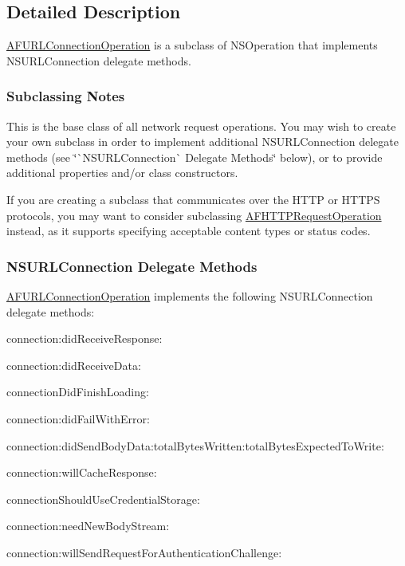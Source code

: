 \subsection{Detailed Description}
{\ttfamily \mbox{\hyperlink{interface_a_f_u_r_l_connection_operation}{A\+F\+U\+R\+L\+Connection\+Operation}}} is a subclass of {\ttfamily N\+S\+Operation} that implements {\ttfamily N\+S\+U\+R\+L\+Connection} delegate methods.

\subsubsection*{Subclassing Notes}

This is the base class of all network request operations. You may wish to create your own subclass in order to implement additional {\ttfamily N\+S\+U\+R\+L\+Connection} delegate methods (see \char`\"{}\`{}\+N\+S\+U\+R\+L\+Connection\`{} Delegate Methods\char`\"{} below), or to provide additional properties and/or class constructors.

If you are creating a subclass that communicates over the H\+T\+TP or H\+T\+T\+PS protocols, you may want to consider subclassing {\ttfamily \mbox{\hyperlink{interface_a_f_h_t_t_p_request_operation}{A\+F\+H\+T\+T\+P\+Request\+Operation}}} instead, as it supports specifying acceptable content types or status codes.

\subsubsection*{N\+S\+U\+R\+L\+Connection Delegate Methods}

{\ttfamily \mbox{\hyperlink{interface_a_f_u_r_l_connection_operation}{A\+F\+U\+R\+L\+Connection\+Operation}}} implements the following {\ttfamily N\+S\+U\+R\+L\+Connection} delegate methods\+:


\begin{DoxyItemize}
\item {\ttfamily connection\+:did\+Receive\+Response\+:}
\item {\ttfamily connection\+:did\+Receive\+Data\+:}
\item {\ttfamily connection\+Did\+Finish\+Loading\+:}
\item {\ttfamily connection\+:did\+Fail\+With\+Error\+:}
\item {\ttfamily connection\+:did\+Send\+Body\+Data\+:total\+Bytes\+Written\+:total\+Bytes\+Expected\+To\+Write\+:}
\item {\ttfamily connection\+:will\+Cache\+Response\+:}
\item {\ttfamily connection\+Should\+Use\+Credential\+Storage\+:}
\item {\ttfamily connection\+:need\+New\+Body\+Stream\+:}
\item {\ttfamily connection\+:will\+Send\+Request\+For\+Authentication\+Challenge\+:}
\end{DoxyItemize}

